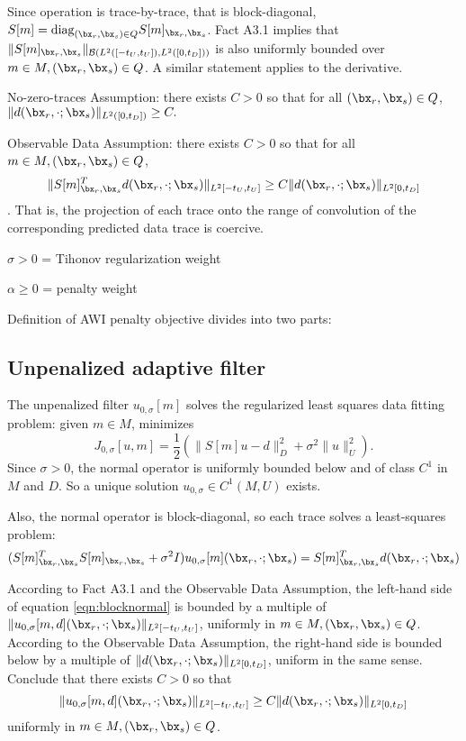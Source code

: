 Since operation is trace-by-trace, that is block-diagonal, $S[m] = \mbox{diag}_{(\bx_r,\bx_s) \in Q}S[m]_{\bx_r,\bx_s}$. Fact A3.1 implies that $\|S[m]_{\bx_r,\bx_s}\|_{{\cal B}(L^2([-t_U,t_U]),L^2([0,t_D]))}$ is also uniformly bounded over $m \in M, (\bx_r,\bx_s) \in Q$. A similar statement applies to the derivative.

No-zero-traces Assumption: there exists $C>0$ so that for all $(\bx_r,\bx_s) \in Q$,
$\|d(\bx_r,\cdot;\bx_s)\|_{L^2([0,t_D])} \ge C.$

Observable Data Assumption: there exists $C>0$ so that for all $m \in M, (\bx_r,\bx_s) \in Q$,
\begin{equation}
  \label{eqn:obsdata}
  \|S[m]_{\bx_r,\bx_s}^Td(\bx_r,\cdot;\bx_s)\|_{L^2[-t_U,t_U]} \ge C \|d(\bx_r,\cdot;\bx_s)\|_{L^2[0,t_D]}
\end{equation}.
That is, the projection of each trace onto the range of convolution of the corresponding predicted data trace is coercive.  

$\sigma > 0$ = Tihonov regularization weight

$\alpha \ge 0$ = penalty weight

Definition of AWI penalty objective divides into two parts:

\subsection{ Unpenalized adaptive filter}
The unpenalized filter $u_{0,\sigma}[m]$ solves the regularized least squares data fitting problem:  given $m \in M$, minimizes
\[
 J_{0,\sigma}[u,m] = \frac{1}{2}(\|S[m]u - d\|_D^2 + \sigma^2 \|u\|^2_U).
\]
Since $\sigma > 0$, the normal operator is uniformly bounded below and of class $C^1$ in $M$ and $D$. So a unique solution $u_{0,\sigma} \in C^1(M, U)$ exists.

Also, the normal operator is block-diagonal, so each trace solves a least-squares problem:
\begin{equation}
  \label{eqn:blocknormal}
  (S[m]_{\bx_r,\bx_s}^TS[m]_{\bx_r,\bx_s} + \sigma^2 I)u_{0,\sigma}[m](\bx_r,\cdot; \bx_s)= S[m]_{\bx_r,\bx_s}^Td(\bx_r,\cdot;\bx_s)
\end{equation}

According to Fact A3.1 and the Observable Data Assumption, the left-hand side of equation \ref{eqn:blocknormal} is bounded by a multiple of $\|u_{0,\sigma}[m,d](\bx_r,\cdot; \bx_s)\|_{L^2[-t_U,t_U]}$, uniformly in $m \in M, (\bx_r,\bx_s) \in Q$. According to the Observable Data Assumption, the right-hand side is bounded below by a multiple of $\|d(\bx_r,\cdot;\bx_s)\|_{L^2[0,t_D]}$, uniform in the same sense. Conclude that there exists $C>0$ so that
\begin{equation}
  \label{eqn:u0lower}
  \|u_{0,\sigma}[m,d](\bx_r,\cdot; \bx_s)\|_{L^2[-t_U,t_U]} \ge C \|d(\bx_r,\cdot;\bx_s)\|_{L^2[0,t_D]}
\end{equation}
uniformly in $m \in M, (\bx_r,\bx_s) \in Q$.

